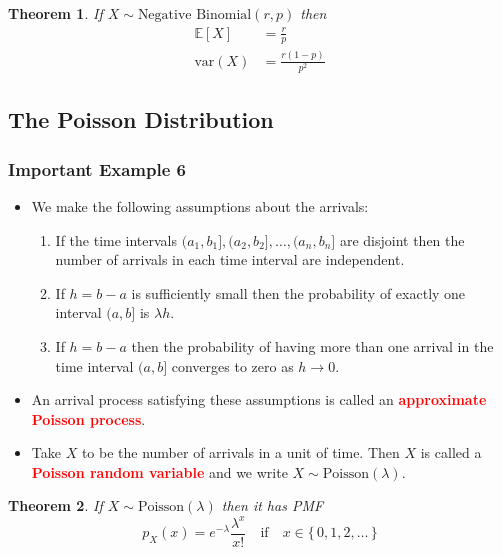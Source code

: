 \documentclass{article}
\newcommand{\E}{\mathbb{E}}
\newcommand{\var}{\text{var}}
\newcommand{\bfred}[1]{\textcolor{red}{\textbf{#1}}}
\theoremstyle{plain}
\newtheorem{thm}{Theorem}[section]
\theoremstyle{definition}
\theoremstyle{remark}
\begin{document}
\begin{thm}
    If $X \sim \text{Negative Binomial}(r,p)$ then 
    \begin{align*}
        \E[X] &= \frac{r}{p} \\
        \var(X) &= \frac{r(1-p)}{p^2}
    \end{align*}
\end{thm}

\subsection{The Poisson Distribution}

\subsubsection*{Important Example 6}

\begin{tcolorbox}[title = Poisson Random Variable, colback = SkyBlue!5!white,colframe = SkyBlue!75!black]
    \begin{itemize}
        \item We make the following assumptions about the arrivals:
        \begin{enumerate}[(1)]
            \item If the time intervals $(a_1,b_1],(a_2,b_2],\dotsc,(a_n,b_n]$ are disjoint then the number of arrivals in each time interval are independent.
            \item If $h=b-a$ is sufficiently small then the probability of exactly one interval $(a,b]$ is $\lambda h$.
            \item If $h=b-a$ then the probability of having more than one arrival in the time interval $(a,b]$ converges to zero as $h \rightarrow 0$.
        \end{enumerate}
        \item An arrival process satisfying these assumptions is called an \bfred{approximate Poisson process}.
        \item Take $X$ to be the number of arrivals in a unit of time. Then $X$ is called a \bfred{Poisson random variable} and we write $X \sim \text{Poisson}(\lambda)$.
    \end{itemize}
\end{tcolorbox}

\begin{thm}
    If $X \sim \text{Poisson}(\lambda)$ then it has PMF \[p_X(x) = e^{-\lambda}\frac{\lambda^x}{x!} \quad \text{if} \quad x \in \{\,0,1,2,\dotsc\,\}\]
\end{thm}
\end{document}
